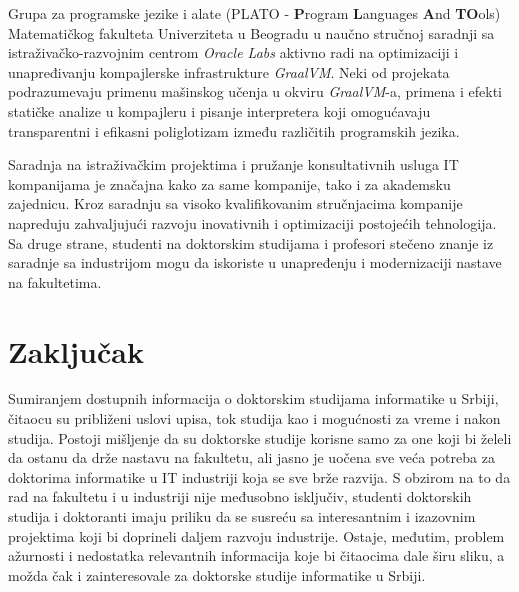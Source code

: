\documentclass[a4paper]{article}
\begin{document}
Grupa za programske jezike i alate (PLATO - \textbf{P}rogram \textbf{L}anguages \textbf{A}nd \textbf{TO}ols) Matematičkog fakulteta Univerziteta u Beogradu u naučno stručnoj saradnji sa istraživačko-razvojnim centrom \textit{Oracle Labs} aktivno radi na optimizaciji i unapređivanju kompajlerske infrastrukture \textit{GraalVM}. Neki od projekata podrazumevaju primenu mašinskog učenja u okviru \textit{GraalVM}-a, primena i efekti statičke analize u kompajleru i pisanje interpretera koji omogućavaju transparentni i efikasni poliglotizam između različitih programskih jezika\cite{plato}.

Saradnja na istraživačkim projektima i pružanje konsultativnih usluga IT kompanijama je značajna kako za same kompanije, tako i za akademsku zajednicu. Kroz saradnju sa visoko kvalifikovanim stručnjacima kompanije napreduju zahvaljujući razvoju inovativnih i optimizaciji postojećih tehnologija. Sa druge strane, studenti na doktorskim studijama i profesori stečeno znanje iz saradnje sa industrijom mogu da iskoriste u unapređenju i modernizaciji nastave na fakultetima.


\section{Zaključak}
\label{sec:zakljucak}

Sumiranjem dostupnih informacija o doktorskim studijama informatike u Srbiji, čitaocu su približeni uslovi upisa, tok studija kao i mogućnosti za vreme i nakon studija. Postoji mišljenje da su doktorske studije korisne samo za one koji bi želeli da ostanu da drže nastavu na fakultetu, ali jasno je uočena sve veća potreba za doktorima informatike u IT industriji koja se sve brže razvija. S obzirom na to da rad na fakultetu i u industriji nije međusobno isključiv, studenti doktorskih studija i doktoranti imaju priliku da se susreću sa interesantnim i izazovnim projektima koji bi doprineli daljem razvoju industrije.
Ostaje, međutim, problem ažurnosti i nedostatka relevantnih informacija koje bi čitaocima dale širu sliku, a možda čak i zainteresovale za doktorske studije informatike u Srbiji.


\appendix
 

\end{document}
